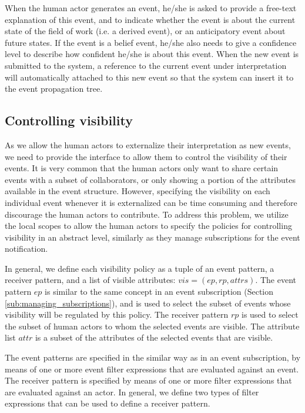 When the human actor generates an event, he/she is asked to provide a free-text explanation of this event, and to indicate whether the event is about the current state of the field of work (i.e. a derived event), or an anticipatory event about future states. If the event is a belief event, he/she also needs to give a confidence level to describe how confident he/she is about this event. When the new event is submitted to the system, a reference to the current event under interpretation will automatically attached to this new event so that the system can insert it to the event propagation tree.

\subsection{Controlling visibility} %
\label{sub:controlling_visibility}
As we allow the human actors to externalize their interpretation as new events, we need to provide the interface to allow them to control the visibility of their events. It is very common that the human actors only want to share certain events with a subset of collaborators, or only showing a portion of the attributes available in the event structure. However, specifying the visibility on each individual event whenever it is externalized can be time consuming and therefore discourage the human actors to contribute. To address this problem, we utilize the local scopes to allow the human actors to specify the policies for controlling visibility in an abstract level, similarly as they manage subscriptions for the event notification.

In general, we define each visibility policy as a tuple of an event pattern, a receiver pattern, and a list of visible attributes: $vis = (ep, rp, attrs)$. The event pattern $ep$ is similar to the same concept in an event subscription (Section \ref{sub:managing_subscriptions}), and is used to select the subset of events whose visibility will be regulated by this policy. The receiver pattern $rp$ is used to select the subset of human actors to whom the selected events are visible. The attribute list $attr$ is a subset of the attributes of the selected events that are visible.

The event patterns are specified in the similar way as in an event subscription, by means of one or more event filter expressions that are evaluated against an event. The receiver pattern is specified by means of one or more filter expressions that are evaluated against an actor. In general, we define two types of filter expressions that can be used to define a receiver pattern.

